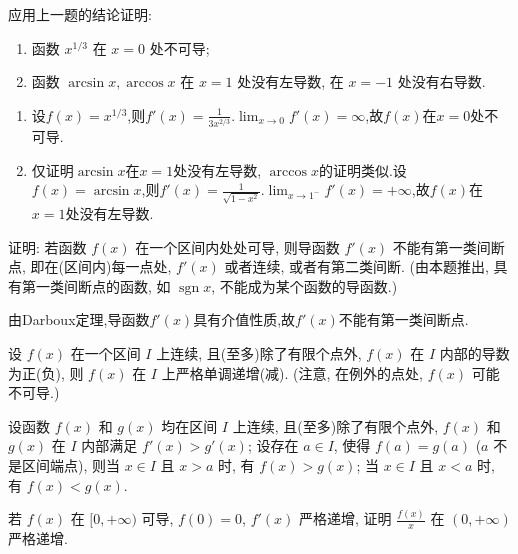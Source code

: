 \begin{exercise}[3.3.14]
    应用上一题的结论证明:
    \begin{enumerate}
        \item 函数 $x^{1/3}$ 在 $x=0$ 处不可导;
        \item 函数 $\arcsin x, \arccos x$ 在 $x=1$ 处没有左导数, 在 $x=-1$ 处没有右导数.
    \end{enumerate}
\end{exercise}

\begin{solution}
    \begin{enumerate}
        \item 设$f(x) = x^{1/3}$,则$f'(x) = \frac{1}{3x^{2/3}}$.$\lim_{x \to 0} f'(x) = \infty$,故$f(x)$在$x = 0$处不可导.
        \item 仅证明$\arcsin x$在$x = 1$处没有左导数, $\arccos x$的证明类似.设$f(x) = \arcsin x$,则$f'(x) = \frac{1}{\sqrt{1-x^2}}$.$\lim_{x \to 1^-} f'(x) = +\infty$,故$f(x)$在$x = 1$处没有左导数.
    \end{enumerate}
\end{solution}

\begin{exercise}[3.3.15]
    证明: 若函数 $f(x)$ 在一个区间内处处可导, 则导函数 $f'(x)$ 不能有第一类间断点, 即在(区间内)每一点处, $f'(x)$ 或者连续, 或者有第二类间断. (由本题推出, 具有第一类间断点的函数, 如 $\operatorname{sgn} x$, 不能成为某个函数的导函数.)
\end{exercise}

\begin{solution}
    由Darboux定理,导函数$f'(x)$具有介值性质,故$f'(x)$不能有第一类间断点.
\end{solution}

\begin{exercise}[3.3.16]
    设 $f(x)$ 在一个区间 $I$ 上连续, 且(至多)除了有限个点外, $f(x)$ 在 $I$ 内部的导数为正(负), 则 $f(x)$ 在 $I$ 上严格单调递增(减). (注意, 在例外的点处, $f(x)$ 可能不可导.)
\end{exercise}

\begin{exercise}[3.3.17]
    设函数 $f(x)$ 和 $g(x)$ 均在区间 $I$ 上连续, 且(至多)除了有限个点外, $f(x)$ 和 $g(x)$ 在 $I$ 内部满足 $f'(x) > g'(x)$; 设存在 $a \in I$, 使得 $f(a)=g(a)$ ($a$ 不是区间端点), 则当 $x \in I$ 且 $x>a$ 时, 有 $f(x)>g(x)$; 当 $x \in I$ 且 $x<a$ 时, 有 $f(x)<g(x)$.
\end{exercise}

\begin{exercise}[3.3.18]
    若 $f(x)$ 在 $[0, +\infty)$ 可导, $f(0)=0$, $f'(x)$ 严格递增, 证明 $\frac{f(x)}{x}$ 在 $(0, +\infty)$ 严格递增.
\end{exercise}


